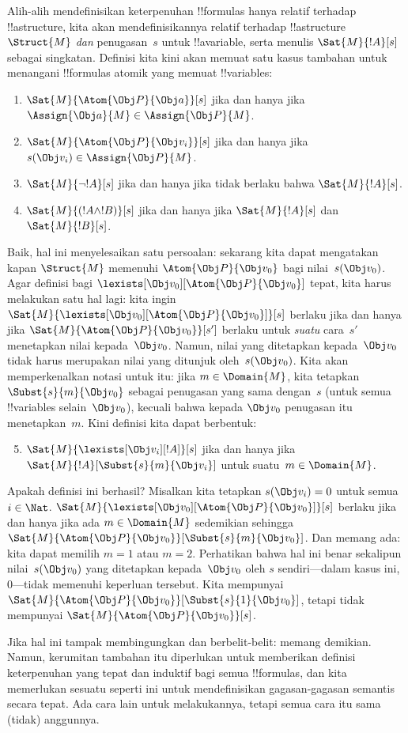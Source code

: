 \documentclass[../../../include/open-logic-section]{subfiles}
\begin{document}
Alih-alih mendefinisikan keterpenuhan !!{formula}s hanya relatif terhadap
!!a{structure}, kita akan mendefinisikannya relatif terhadap
!!a{structure}~$\Struct{M}$ \emph{dan} penugasan~$s$ untuk !!a{variable},
serta menulis $\Sat{M}{!A}[s]$ sebagai singkatan. Definisi kita kini akan
memuat satu kasus tambahan untuk menangani !!{formula}s atomik yang memuat
!!{variable}s:
\begin{enumerate}
  \item $\Sat{M}{\Atom{\Obj P}{\Obj a}}[s]$ jika dan hanya jika
  $\Assign{\Obj a}{M} \in \Assign{\Obj P}{M}$.
  \item $\Sat{M}{\Atom{\Obj P}{\Obj v_i}}[s]$ jika dan hanya jika
  $s(\Obj v_i) \in \Assign{\Obj P}{M}$.
  \item $\Sat{M}{\lnot !A}[s]$ jika dan hanya jika tidak berlaku bahwa
  $\Sat{M}{!A}[s]$.
  \item $\Sat{M}{(!A \land !B)}[s]$ jika dan hanya jika $\Sat{M}{!A}[s]$
  dan $\Sat{M}{!B}[s]$.
\end{enumerate}
Baik, hal ini menyelesaikan satu persoalan: sekarang kita dapat mengatakan
kapan $\Struct{M}$ memenuhi $\Atom{\Obj P}{\Obj v_0}$ bagi nilai~$s(\Obj
v_0)$. Agar definisi bagi $\lexists[\Obj v_0][\Atom{\Obj P}{\Obj v_0}]$
tepat, kita harus melakukan satu hal lagi: kita ingin
$\Sat{M}{\lexists[\Obj v_0][\Atom{\Obj P}{\Obj v_0}]}[s]$ berlaku jika dan
hanya jika $\Sat{M}{\Atom{\Obj P}{\Obj v_0}}[s']$ berlaku untuk \emph{suatu}
cara~$s'$ menetapkan nilai kepada~$\Obj v_0$. Namun, nilai yang ditetapkan
kepada~$\Obj v_0$ tidak harus merupakan nilai yang ditunjuk oleh~$s(\Obj
v_0)$. Kita akan memperkenalkan notasi untuk itu: jika $m \in \Domain{M}$,
kita tetapkan $\Subst{s}{m}{\Obj v_0}$ sebagai penugasan yang sama dengan~$s$
(untuk semua !!{variable}s selain~$\Obj v_0$), kecuali bahwa kepada $\Obj v_0$
penugasan itu menetapkan~$m$. Kini definisi kita dapat berbentuk:
\begin{enumerate}\setcounter{enumi}{4}
  \item $\Sat{M}{\lexists[\Obj v_i][!A]}[s]$ jika dan hanya jika
  $\Sat{M}{!A}[\Subst{s}{m}{\Obj v_i}]$ untuk suatu~$m \in \Domain{M}$.
\end{enumerate}
Apakah definisi ini berhasil? Misalkan kita tetapkan $s(\Obj v_i) = 0$ untuk
semua~$i \in \Nat$. $\Sat{M}{\lexists[\Obj v_0][\Atom{\Obj P}{\Obj
v_0}]}[s]$ berlaku jika dan hanya jika ada $m \in \Domain{M}$ sedemikian
sehingga $\Sat{M}{\Atom{\Obj P}{\Obj v_0}}[\Subst{s}{m}{\Obj v_0}]$. Dan
memang ada: kita dapat memilih $m = 1$ atau $m = 2$. Perhatikan bahwa hal ini
benar sekalipun nilai~$s(\Obj v_0)$ yang ditetapkan kepada~$\Obj v_0$ oleh
$s$ sendiri---dalam kasus ini, $0$---tidak memenuhi keperluan tersebut. Kita
mempunyai $\Sat{M}{\Atom{\Obj P}{\Obj v_0}}[\Subst{s}{1}{\Obj v_0}]$, tetapi
tidak mempunyai $\Sat{M}{\Atom{\Obj P}{\Obj v_0}}[s]$.

Jika hal ini tampak membingungkan dan berbelit-belit: memang demikian. Namun,
kerumitan tambahan itu diperlukan untuk memberikan definisi keterpenuhan yang
tepat dan induktif bagi semua !!{formula}s, dan kita memerlukan sesuatu
seperti ini untuk mendefinisikan gagasan-gagasan semantis secara tepat. Ada
cara lain untuk melakukannya, tetapi semua cara itu sama (tidak) anggunnya.
\end{document}
